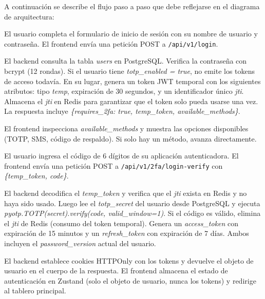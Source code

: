\documentclass[12pt,letterpaper]{article}
\begin{document}
A continuaci\'on se describe el flujo paso a paso que debe reflejarse en el diagrama de arquitectura:

\begin{description}[itemsep=4pt]
    \item[Paso 1: Credenciales.] El usuario completa el formulario de inicio de sesi\'on con su nombre de usuario y contrase\~na. El frontend env\'ia una petici\'on POST a \texttt{/api/v1/login}.

    \item[Paso 2: Validaci\'on.] El backend consulta la tabla \textit{users} en PostgreSQL. Verifica la contrase\~na con bcrypt (12 rondas). Si el usuario tiene \textit{totp\_enabled = true}, no emite los tokens de acceso todav\'ia. En su lugar, genera un token JWT temporal con los siguientes atributos: tipo \textit{temp}, expiraci\'on de 30 segundos, y un identificador \'unico \textit{jti}. Almacena el \textit{jti} en Redis para garantizar que el token solo pueda usarse una vez. La respuesta incluye \textit{\{requires\_2fa: true, temp\_token, available\_methods\}}.

    \item[Paso 3: Selecci\'on de m\'etodo.] El frontend inspecciona \textit{available\_methods} y muestra las opciones disponibles (TOTP, SMS, c\'odigo de respaldo). Si solo hay un m\'etodo, avanza directamente.

    \item[Paso 4: Verificaci\'on TOTP.] El usuario ingresa el c\'odigo de 6 d\'igitos de su aplicaci\'on autenticadora. El frontend env\'ia una petici\'on POST a \texttt{/api/v1/2fa/login-verify} con \textit{\{temp\_token, code\}}.

    \item[Paso 5: Validaci\'on del segundo factor.] El backend decodifica el \textit{temp\_token} y verifica que el \textit{jti} exista en Redis y no haya sido usado. Luego lee el \textit{totp\_secret} del usuario desde PostgreSQL y ejecuta \textit{pyotp.TOTP(secret).verify(code, valid\_window=1)}. Si el c\'odigo es v\'alido, elimina el \textit{jti} de Redis (consumo del token temporal). Genera un \textit{access\_token} con expiraci\'on de 15 minutos y un \textit{refresh\_token} con expiraci\'on de 7 d\'ias. Ambos incluyen el \textit{password\_version} actual del usuario.

    \item[Paso 6: Entrega de sesi\'on.] El backend establece cookies HTTPOnly con los tokens y devuelve el objeto de usuario en el cuerpo de la respuesta. El frontend almacena el estado de autenticaci\'on en Zustand (solo el objeto de usuario, nunca los tokens) y redirige al tablero principal.
\end{description}
\end{document}
